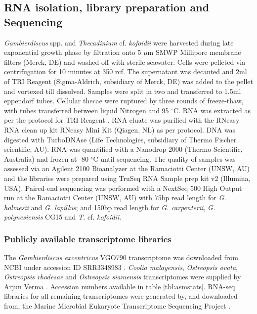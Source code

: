 \documentclass[fleqn,10pt,lineno]{wlpeerj} %
\begin{document}
\subsection*{RNA isolation, library preparation and Sequencing}
\emph{Gambierdiscus} spp. and \emph{Thecadinium} cf. \emph{kofoidii} were harvested during late exponential growth phase by filtration onto 5 $\mu$m SMWP Millipore membrane filters (Merck, DE) and washed off with sterile seawater. %
Cells were pelleted via centrifugation for 10 minutes at 350 rcf. 
The supernatant was decanted and 2ml of TRI Reagent (Sigma-Aldrich, subsidiary of Merck, DE) was added to the pellet and vortexed till dissolved. %
Samples were split in two and transferred to 1.5ml eppendorf tubes. 
Cellular thecae were ruptured by three rounds of freeze-thaw, with tubes transferred between liquid Nitrogen and 95 $^{\circ}$C. %
RNA was extracted as per the protocol for TRI Reagent \cite{rio2010purification}.
RNA eluate was purified with the RNeasy RNA clean up kit RNeasy Mini Kit (Qiagen, NL) as per protocol. 
DNA was digested with TurboDNAse (Life Technologies, subsidiary of Thermo Fischer scientific, AU). 
RNA was quantified with a Nanodrop 2000 (Thermo Scientific, Australia) and frozen at -80 $^{\circ}$C until sequencing.
The quality of samples was assessed via an Agilent 2100 Bioanalyzer at the Ramaciotti Center (UNSW, AU) and the libraries were prepared using TruSeq RNA Sample prep kit v2 (Illumina, USA). 
Paired-end sequencing was performed with a NextSeq 500 High Output run at the Ramaciotti Center (UNSW, AU) with 75bp read length for \emph{G. holmesii} and \emph{G. lapillus}; and 150bp read length for \emph{G. carpenterii}, \emph{G. polynesiensis} CG15 and \emph{T.} cf. \emph{kofoidii}.%

\subsubsection*{Publicly available transcriptome libraries}
The \emph{Gambierdiscus excentricus} VGO790 transcriptome was downloaded from NCBI under accession ID SRR3348983 \cite{kohli2017role}. 
\textit{Coolia malayensis}, \textit{Ostreopsis ovata}, \textit{Ostreopsis rhodesae} and \textit{Ostreopsis siamensis} transcriptomes were supplied by Arjun Verma \cite{verma2018comparative}. %
Accession numbers available in table \ref{tbl:asmstats}. 
RNA-seq libraries for all remaining transcriptomes were generated by, and downloaded from, the Marine Microbial Eukaryote Transcriptome Sequencing Project \citep{keeling2014marine}.
\end{document}
